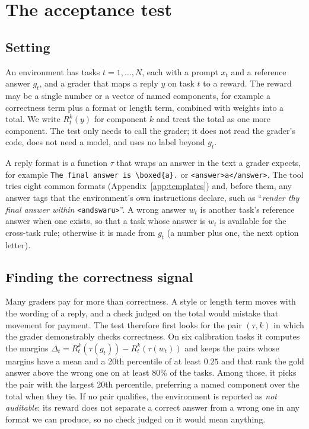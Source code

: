 \section{The acceptance test}
\label{sec:method}

\subsection{Setting}

An environment has tasks $t = 1,\dots,N$, each with a prompt $x_t$ and a reference answer $g_t$, and a grader that maps a reply $y$ on task $t$ to a reward. The reward may be a single number or a vector of named components, for example a correctness term plus a format or length term, combined with weights into a total. We write $R_t^k(y)$ for component $k$ and treat the total as one more component. The test only needs to call the grader; it does not read the grader's code, does not need a model, and uses no label beyond $g_t$.

A reply format is a function $\tau$ that wraps an answer in the text a grader expects, for example \verb|The final answer is \boxed{a}.| or \verb|<answer>a</answer>|. The tool tries eight common formats (Appendix~\ref{app:templates}) and, before them, any answer tags that the environment's own instructions declare, such as ``\emph{render thy final answer within} \verb|<andswaru>|''. A wrong answer $w_t$ is another task's reference answer when one exists, so that a task whose answer is $w_t$ is available for the cross-task rule; otherwise it is made from $g_t$ (a number plus one, the next option letter).

\subsection{Finding the correctness signal}
\label{sec:signal}

Many graders pay for more than correctness. A style or length term moves with the wording of a reply, and a check judged on the total would mistake that movement for payment. The test therefore first looks for the pair $(\tau, k)$ in which the grader demonstrably checks correctness. On six calibration tasks it computes the margins $\Delta_t = R_t^k(\tau(g_t)) - R_t^k(\tau(w_t))$ and keeps the pairs whose margins have a mean and a 20th percentile of at least $0.25$ and that rank the gold answer above the wrong one on at least 80\% of the tasks. Among those, it picks the pair with the largest 20th percentile, preferring a named component over the total when they tie. If no pair qualifies, the environment is reported as \emph{not auditable}: its reward does not separate a correct answer from a wrong one in any format we can produce, so no check judged on it would mean anything.

